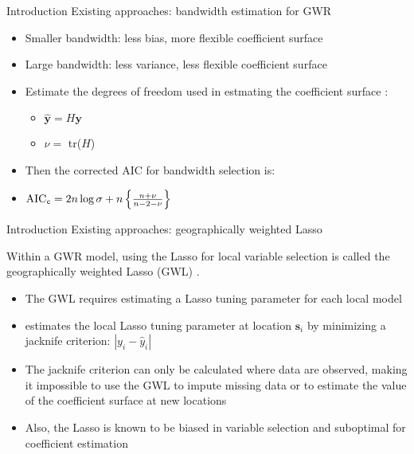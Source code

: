 \documentclass[12pt,t]{beamer}
\newcommand{\subt}[1]{{\footnotesize \color{subtitle} {#1}}}
\begin{document}
\begin{frame}{Introduction}
\subt{Existing approaches: bandwidth estimation for GWR}

\bigskip
\begin{itemize}
    \item Smaller bandwidth: less bias, more flexible coefficient surface
    \item Large bandwidth: less variance, less flexible coefficient surface
    \item Estimate the degrees of freedom used in estmating the coefficient surface \citep{Hurvich:1998}:
    \begin{itemize}
        \item $\hat{\bm{y}} = H\bm{y}$
        \item $\nu = $ tr($H$)
    \end{itemize}
    \item Then the corrected AIC for bandwidth selection is:
    \item $\text{AIC}_{\tt c} = 2 n \log{\sigma} + n \left\{\frac{n + \nu}{n - 2 - \nu}\right\}$
\end{itemize}

\end{frame}





\begin{frame}{Introduction}
\subt{Existing approaches: geographically weighted Lasso}

\bigskip
Within a GWR model, using the Lasso \citep{Tibshirani:1996} for local variable selection is called the geographically weighted Lasso (GWL) \citep{Wheeler:2009}.

\begin{itemize}
    \item The GWL requires estimating a Lasso tuning parameter for each local model
    \item \cite{Wheeler:2009} estimates the local Lasso tuning parameter at location $\bm{s}_i$ by minimizing a jacknife criterion: $|y_i - \hat{y}_i|$
    \item The jacknife criterion can only be calculated where data are observed, making it impossible to use the GWL to impute missing data or to estimate the value of the coefficient surface at new locations
    \item Also, the Lasso is known to be biased in variable selection and suboptimal for coefficient estimation
\end{itemize}

\end{frame}
\end{document}
